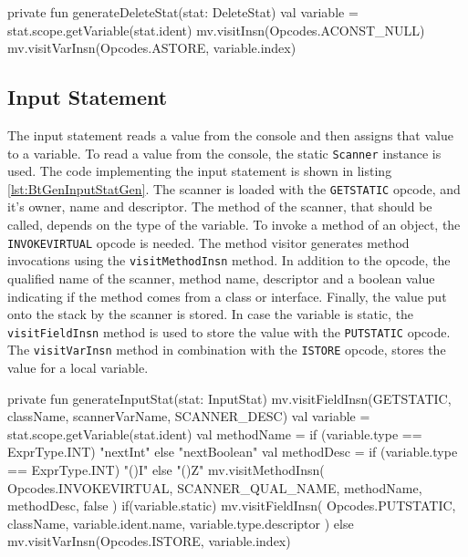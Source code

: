 \begin{KotlinCode}[float,numbers=none,caption=Implementation of the \texttt{generateDeleteStat} method of the \texttt{StatGenerator}., label=lst:BtGenDeleteStatGen]
private fun generateDeleteStat(stat: DeleteStat) {
    val variable = stat.scope.getVariable(stat.ident)
    mv.visitInsn(Opcodes.ACONST_NULL)
    mv.visitVarInsn(Opcodes.ASTORE, variable.index)
}
\end{KotlinCode}

\subsection{Input Statement}

The input statement reads a value from the console and then assigns that value to a variable. To read a value from the console, the static \verb|Scanner| instance is used. The code implementing the input statement is shown in listing \ref{lst:BtGenInputStatGen}. The scanner is loaded with the \verb|GETSTATIC| opcode, and it's owner, name and descriptor. The method of the scanner, that should be called, depends on the type of the variable. To invoke a method of an object, the \verb|INVOKEVIRTUAL| opcode is needed. The method visitor generates method invocations using the \verb|visitMethodInsn| method. In addition to the opcode, the qualified name of the scanner, method name, descriptor and a boolean value indicating if the method comes from a class or interface. Finally, the value put onto the stack by the scanner is stored. In case the variable is static, the \verb|visitFieldInsn| method is used to store the value with the \verb|PUTSTATIC| opcode. The \verb|visitVarInsn| method in combination with the \verb|ISTORE| opcode, stores the value for a local variable. 


\begin{KotlinCode}[float,numbers=none,caption=Implementation of the \texttt{generateInputStat} method of the \texttt{StatGenerator}., label=lst:BtGenInputStatGen]
private fun generateInputStat(stat: InputStat) {
    mv.visitFieldInsn(GETSTATIC, className, scannerVarName, SCANNER_DESC)
    val variable = stat.scope.getVariable(stat.ident)
    val methodName = if (variable.type == ExprType.INT) "nextInt" else "nextBoolean"
    val methodDesc = if (variable.type == ExprType.INT) "()I" else "()Z"
    mv.visitMethodInsn(
        Opcodes.INVOKEVIRTUAL,
        SCANNER_QUAL_NAME,
        methodName,
        methodDesc,
        false
    )
    if(variable.static) {
        mv.visitFieldInsn(
            Opcodes.PUTSTATIC,
            className,
            variable.ident.name,
            variable.type.descriptor
        )
    } else {
        mv.visitVarInsn(Opcodes.ISTORE, variable.index)
    }
}
\end{KotlinCode}

